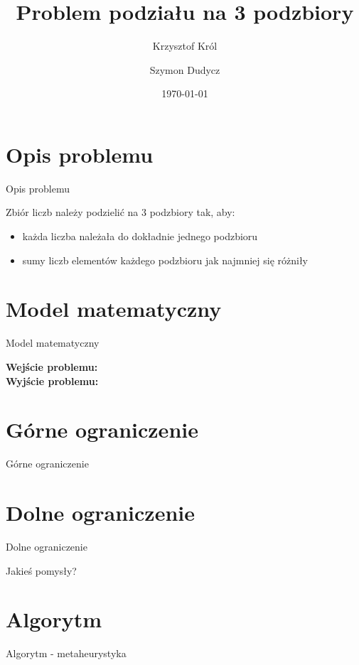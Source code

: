 \documentclass{beamer}
\title{Problem podziału na 3 podzbiory}
\author{
       Krzysztof Król\and
                Szymon Dudycz
}
\date{\today}
\begin{document}
\begin{frame}
  \titlepage
\end{frame}


\section{Opis problemu}

\begin{frame}{Opis problemu}

Zbiór liczb należy podzielić na 3 podzbiory tak, aby:
\begin{itemize}  
\item każda liczba należała do dokładnie jednego podzbioru
\item sumy liczb elementów każdego podzbioru jak najmniej się różniły
\end{itemize}


\end{frame}


\section{Model matematyczny}

\begin{frame}{Model matematyczny}

\textbf{Wejście problemu:}
\\[0.1in]\textbf{Wyjście problemu:}\\


\end{frame}

\section{Górne ograniczenie}

\begin{frame}{Górne ograniczenie}


\end{frame}

\section{Dolne ograniczenie}

\begin{frame}{Dolne ograniczenie}

Jakieś pomysły?

\end{frame}

\section{Algorytm}

\begin{frame}{Algorytm - metaheurystyka}


\end{frame}
\end{document}
